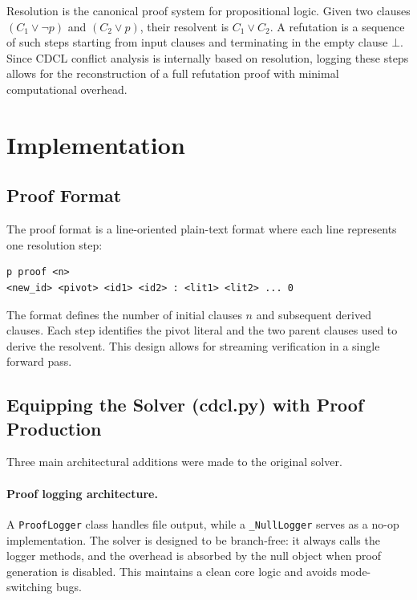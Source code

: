\documentclass{article}
\begin{document}
Resolution is the canonical proof system for propositional logic.
Given two clauses $(C_1 \vee \neg p)$ and $(C_2 \vee p)$, their
resolvent is $C_1 \vee C_2$.
A refutation is a sequence of such steps starting from input clauses
and terminating in the empty clause $\bot$.
Since CDCL conflict analysis is internally based on resolution, logging
these steps allows for the reconstruction of a full refutation proof
with minimal computational overhead.

\section{Implementation}

\subsection{Proof Format}

The proof format is a line-oriented plain-text format where each line
represents one resolution step:

\begin{lstlisting}
p proof <n>
<new_id> <pivot> <id1> <id2> : <lit1> <lit2> ... 0
\end{lstlisting}

\noindent
The format defines the number of initial clauses $n$ and subsequent
derived clauses.
Each step identifies the pivot literal and the two parent clauses used
to derive the resolvent.
This design allows for streaming verification in a single forward pass.

\subsection{Equipping the Solver (cdcl.py) with Proof Production}

Three main architectural additions were made to the original solver.

\paragraph{Proof logging architecture.}
A \texttt{ProofLogger} class handles file output, while a \texttt{\_NullLogger}
serves as a no-op implementation.
The solver is designed to be branch-free: it always calls the logger
methods, and the overhead is absorbed by the null object when proof
generation is disabled.
This maintains a clean core logic and avoids mode-switching bugs.
\end{document}
